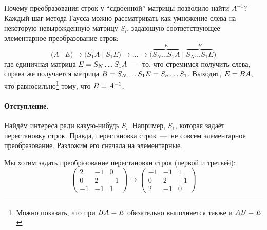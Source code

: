 \documentclass[a4paper,12pt]{article}
\begin{document}
\begin{solution}
    Почему преобразования строк у ``сдвоенной'' матрицы позволило найти $A^{-1}$?
    Каждый шаг метода Гаусса можно рассматривать как умножение слева на некоторую невырожденную матрицу $S_i$, задающую соответствующее элементарное преобразование строк:
    \[
      \bigl(A \mid E\bigr) \to \bigl(S_1 A \mid S_1 E\bigr) \to \ldots
      \to \bigl(\overbrace{S_N \ldots S_1 A}^{E} \mid \overbrace{S_N \ldots S_1 E}^{B}\bigr)
    \]
    где единичная матрица $E \hm= S_N \ldots S_1 A$~---~то, что стремимся получить слева, справа же получается матрица $B \hm= S_N \ldots S_1 E \hm= S_n \ldots S_1$.
    Выходит, $E \hm= BA$, что равносильно\footnote{Можно показать, что при $BA \hm= E$ обязательно выполняется также и $AB \hm= E$} тому, что $B \hm= A^{-1}$.
    
    \bigskip
    
    \paragraph{Отступление.}
    
    Найдём интереса ради какую-нибудь $S_i$.
    Например, $S_1$, которая задаёт перестановку строк.
    Правда, перестановка строк~---~не совсем элементарное преобразование.
    Разложим его сначала на элементарные.
    
    Мы хотим задать преобразование перестановки строк (первой и третьей):
    \[
      \begin{pmatrix}
        2 & -1 & 0\\
        0 & 2 & -1\\
        -1 & -1 & 1
      \end{pmatrix}
      \longrightarrow \begin{pmatrix}
        -1 & -1 & 1\\
        0 & 2 & -1\\
        2 & -1 & 0
      \end{pmatrix}
    \]
    

\end{solution}
\end{document}
